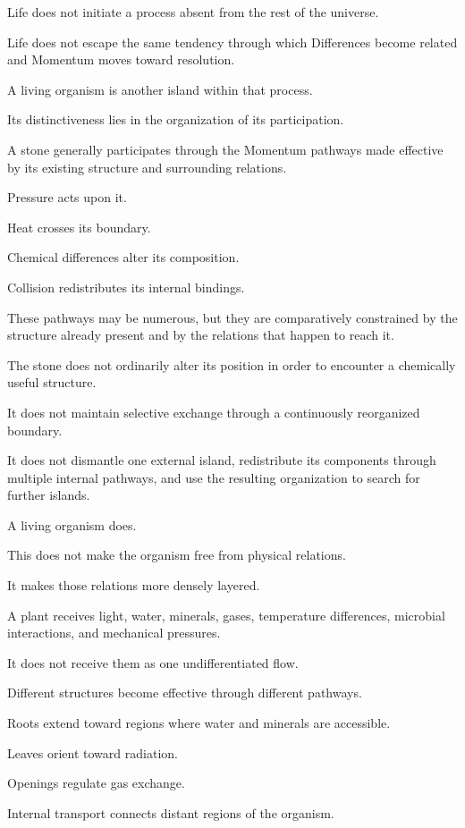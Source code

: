 Life does not initiate a process absent from the rest of the universe.

Life does not escape the same tendency through which Differences become related and Momentum moves toward resolution.

A living organism is another island within that process.

Its distinctiveness lies in the organization of its participation.

A stone generally participates through the Momentum pathways made effective by its existing structure and surrounding relations.

Pressure acts upon it.

Heat crosses its boundary.

Chemical differences alter its composition.

Collision redistributes its internal bindings.

These pathways may be numerous, but they are comparatively constrained by the structure already present and by the relations that happen to reach it.

The stone does not ordinarily alter its position in order to encounter a chemically useful structure.

It does not maintain selective exchange through a continuously reorganized boundary.

It does not dismantle one external island, redistribute its components through multiple internal pathways, and use the resulting organization to search for further islands.

A living organism does.

This does not make the organism free from physical relations.

It makes those relations more densely layered.

A plant receives light, water, minerals, gases, temperature differences, microbial interactions, and mechanical pressures.

It does not receive them as one undifferentiated flow.

Different structures become effective through different pathways.

Roots extend toward regions where water and minerals are accessible.

Leaves orient toward radiation.

Openings regulate gas exchange.

Internal transport connects distant regions of the organism.

